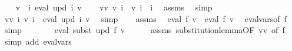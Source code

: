\begin{isabellebody}
\ \ \isamarkupfalse%
\ {\isacharquery}{\kern0pt}v{\isacharprime}{\kern0pt}{\isacharprime}{\kern0pt}\ {\isacharequal}{\kern0pt}\ {\isachardoublequoteopen}{\isasymlambda}i{\isachardot}{\kern0pt}\ eval\ {\isacharparenleft}{\kern0pt}upd\ i{\isacharparenright}{\kern0pt}\ v{\isachardoublequoteclose}\isanewline
\ \ \isamarkupfalse%
\ v{\isacharprime}{\kern0pt}{\isacharunderscore}{\kern0pt}v{\isacharprime}{\kern0pt}{\isacharprime}{\kern0pt}{\isacharcolon}{\kern0pt}\ {\isachardoublequoteopen}{\isacharquery}{\kern0pt}v{\isacharprime}{\kern0pt}\ i\ {\isacharequal}{\kern0pt}\ {\isacharquery}{\kern0pt}v{\isacharprime}{\kern0pt}{\isacharprime}{\kern0pt}\ i{\isachardoublequoteclose}\ \ i\ \isamarkupfalse%
\ assms\ \isamarkupfalse%
\ simp\isanewline
\ \ \isamarkupfalse%
\ \isamarkupfalse%
\ v{\isacharunderscore}{\kern0pt}v{\isacharprime}{\kern0pt}{\isacharprime}{\kern0pt}{\isacharcolon}{\kern0pt}\ {\isachardoublequoteopen}{\isasymforall}i{\isachardot}{\kern0pt}\ {\isacharquery}{\kern0pt}v{\isacharprime}{\kern0pt}{\isacharprime}{\kern0pt}\ i\ {\isacharequal}{\kern0pt}\ eval\ {\isacharparenleft}{\kern0pt}upd\ i{\isacharparenright}{\kern0pt}\ v{\isachardoublequoteclose}\ \isamarkupfalse%
\ simp\isanewline
\ \ \isamarkupfalse%
\ assms\ \isamarkupfalse%
\ {\isachardoublequoteopen}eval\ f\ v\ {\isacharequal}{\kern0pt}\ eval\ f\ {\isacharquery}{\kern0pt}v{\isacharprime}{\kern0pt}{\isachardoublequoteclose}\ \isamarkupfalse%
\ eval{\isacharunderscore}{\kern0pt}vars{\isacharbrackleft}{\kern0pt}of\ f{\isacharbrackright}{\kern0pt}\ \isamarkupfalse%
\ simp\isanewline
\ \ \isamarkupfalse%
\ \isamarkupfalse%
\ {\isachardoublequoteopen}{\isasymdots}\ {\isacharequal}{\kern0pt}\ eval\ {\isacharparenleft}{\kern0pt}subst\ upd\ f{\isacharparenright}{\kern0pt}\ v{\isachardoublequoteclose}\isanewline
\ \ \ \ \isamarkupfalse%
\ assms\ substitution{\isacharunderscore}{\kern0pt}lemma{\isacharbrackleft}{\kern0pt}OF\ v{\isacharunderscore}{\kern0pt}v{\isacharprime}{\kern0pt}{\isacharprime}{\kern0pt}{\isacharcomma}{\kern0pt}\ of\ f{\isacharbrackright}{\kern0pt}\ \isamarkupfalse%
\ {\isacharparenleft}{\kern0pt}simp\ add{\isacharcolon}{\kern0pt}\ eval{\isacharunderscore}{\kern0pt}vars{\isacharparenright}{\kern0pt}\isanewline
\ \ \isamarkupfalse%
\ \isamarkupfalse%

\end{isabellebody}
